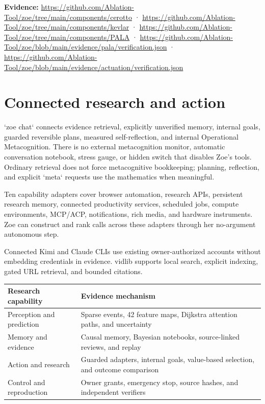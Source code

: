 \documentclass[11pt]{article}
\newcommand{\evidence}[1]{\par\smallskip\small\color{ZoeGray}\textbf{Evidence:} #1\normalsize\par\smallskip}
\begin{document}
\evidence{\url{https://github.com/Ablation-Tool/zoe/tree/main/components/cerotto} · \url{https://github.com/Ablation-Tool/zoe/tree/main/components/kevlar} · \url{https://github.com/Ablation-Tool/zoe/tree/main/components/PALA} · \url{https://github.com/Ablation-Tool/zoe/blob/main/evidence/pala/verification.json} · \url{https://github.com/Ablation-Tool/zoe/blob/main/evidence/actuation/verification.json}}

\clearpage
\section{Connected research and action}

`zoe chat` connects evidence retrieval, explicitly unverified memory, internal goals, guarded reversible plans, measured self-reflection, and internal Operational Metacognition. There is no external metacognition monitor, automatic conversation notebook, stress gauge, or hidden switch that disables Zoe's tools. Ordinary retrieval does not force metacognitive bookkeeping; planning, reflection, and explicit `meta` requests use the mathematics when meaningful.

Ten capability adapters cover browser automation, research APIs, persistent research memory, connected productivity services, scheduled jobs, compute environments, MCP/ACP, notifications, rich media, and hardware instruments. Zoe can construct and rank calls across these adapters through her no-argument autonomous step.

Connected Kimi and Claude CLIs use existing owner-authorized accounts without embedding credentials in evidence. vidlib supports local search, explicit indexing, gated URL retrieval, and bounded citations.

\begin{longtable}{p{}p{}}
\toprule
\textbf{Research capability} & \textbf{Evidence mechanism}\\
\midrule
Perception and prediction & Sparse events, 42 feature maps, Dijkstra attention paths, and uncertainty\\
Memory and evidence & Causal memory, Bayesian notebooks, source-linked reviews, and replay\\
Action and research & Guarded adapters, internal goals, value-based selection, and outcome comparison\\
Control and reproduction & Owner grants, emergency stop, source hashes, and independent verifiers\\
\bottomrule
\end{longtable}
\end{document}
